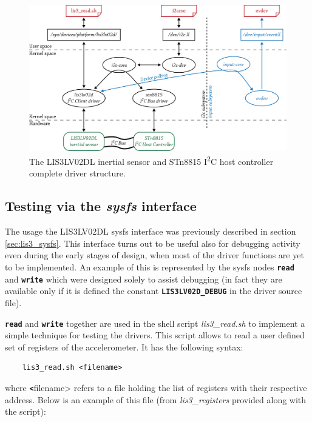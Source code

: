 \documentclass[a4paper,10pt]{article}
\newcommand{\icc}{I\textsuperscript{2}C }
\newcommand{\keyword}[1]{\texttt{\textbf{#1}}}
\begin{document}
\begin{multicols}{2}
\begin{figure}
 \centering
 \includegraphics[width=15cm]{./figures/nhk8815-whole-driver-system.png}
 \caption{The LIS3LV02DL inertial sensor and STn8815 \icc host controller
 	complete driver structure.}
 \label{fig:whole-driver-system}
\end{figure}


\subsection{Testing via the \emph{sysfs} interface}
\label{sec:sysfs-testing}
The usage the LIS3LV02DL sysfs interface was previously described in section
\ref{sec:lis3_sysfs}.
This interface turns out to be useful also for debugging activity even
during the early stages of design, when most of the driver functions are yet
to be implemented.
An example of this is represented by the sysfs nodes \keyword{read} and
\keyword{write} which were designed solely to assist debugging (in fact they
are available only if it is defined the constant \keyword{LIS3LV02D\_DEBUG}
in the driver source file). 

\keyword{read} and \keyword{write} together are used in the shell script
\emph{lis3\_read.sh} to implement a simple technique for testing the drivers.
This script allows to read a user defined set of registers of the accelerometer.
It has the following syntax:
\begin{verbatim}
	lis3_read.sh <filename>
\end{verbatim}
where \keyword <filename> refers to a file holding the list of registers with
their respective address. Below is an example of this file (from \emph{lis3\_registers} provided along with the script):


\end{multicols}
\end{document}
